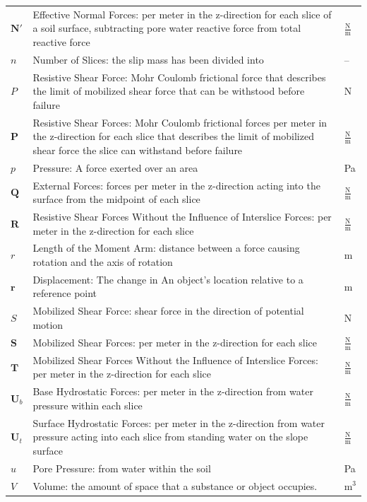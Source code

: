 \documentclass[12pt]{article}
\begin{document}
\begin{longtabu}{l X[l] l}
$\mathbf{N'}$ & Effective Normal Forces: per meter in the z-direction for each slice of a soil surface, subtracting pore water reactive force from total reactive force & $\frac{\text{N}}{\text{m}}$
\\
$n$ & Number of Slices: the slip mass has been divided into & --
\\
$P$ & Resistive Shear Force: Mohr Coulomb frictional force that describes the limit of mobilized shear force that can be withstood before failure & N
\\
$\mathbf{P}$ & Resistive Shear Forces: Mohr Coulomb frictional forces per meter in the z-direction for each slice that describes the limit of mobilized shear force the slice can withstand before failure & $\frac{\text{N}}{\text{m}}$
\\
$p$ & Pressure: A force exerted over an area & Pa
\\
$\mathbf{Q}$ & External Forces: forces per meter in the z-direction acting into the surface from the midpoint of each slice & $\frac{\text{N}}{\text{m}}$
\\
$\mathbf{R}$ & Resistive Shear Forces Without the Influence of Interslice Forces: per meter in the z-direction for each slice & $\frac{\text{N}}{\text{m}}$
\\
$r$ & Length of the Moment Arm: distance between a force causing rotation and the axis of rotation & m
\\
$\mathbf{r}$ & Displacement: The change in An object's location relative to a reference point & m
\\
$S$ & Mobilized Shear Force: shear force in the direction of potential motion & N
\\
$\mathbf{S}$ & Mobilized Shear Forces: per meter in the z-direction for each slice & $\frac{\text{N}}{\text{m}}$
\\
$\mathbf{T}$ & Mobilized Shear Forces Without the Influence of Interslice Forces: per meter in the z-direction for each slice & $\frac{\text{N}}{\text{m}}$
\\
${\mathbf{U}_{b}}$ & Base Hydrostatic Forces: per meter in the z-direction from water pressure within each slice & $\frac{\text{N}}{\text{m}}$
\\
${\mathbf{U}_{t}}$ & Surface Hydrostatic Forces: per meter in the z-direction from water pressure acting into each slice from standing water on the slope surface & $\frac{\text{N}}{\text{m}}$
\\
$u$ & Pore Pressure: from water within the soil & Pa
\\
$V$ & Volume: the amount of space that a substance or object occupies. & $\text{m}^{3}$

\end{longtabu}
\end{document}
